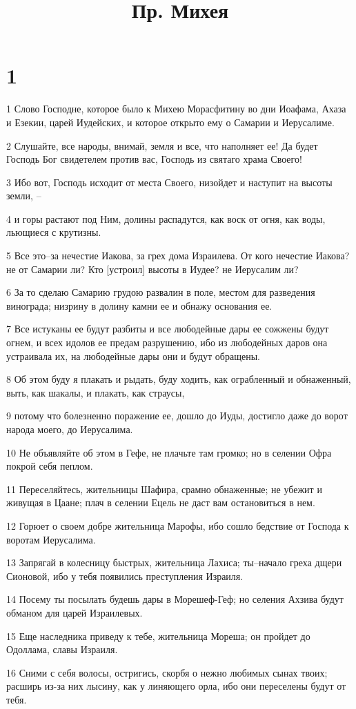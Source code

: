 

\title{Пр. Михея}


\chapter{1}

\par 1 Слово Господне, которое было к Михею Морасфитину во дни Иоафама, Ахаза и Езекии, царей Иудейских, и которое открыто ему о Самарии и Иерусалиме.
\par 2 Слушайте, все народы, внимай, земля и все, что наполняет ее! Да будет Господь Бог свидетелем против вас, Господь из святаго храма Своего!
\par 3 Ибо вот, Господь исходит от места Своего, низойдет и наступит на высоты земли, --
\par 4 и горы растают под Ним, долины распадутся, как воск от огня, как воды, льющиеся с крутизны.
\par 5 Все это--за нечестие Иакова, за грех дома Израилева. От кого нечестие Иакова? не от Самарии ли? Кто [устроил] высоты в Иудее? не Иерусалим ли?
\par 6 За то сделаю Самарию грудою развалин в поле, местом для разведения винограда; низрину в долину камни ее и обнажу основания ее.
\par 7 Все истуканы ее будут разбиты и все любодейные дары ее сожжены будут огнем, и всех идолов ее предам разрушению, ибо из любодейных даров она устраивала их, на любодейные дары они и будут обращены.
\par 8 Об этом буду я плакать и рыдать, буду ходить, как ограбленный и обнаженный, выть, как шакалы, и плакать, как страусы,
\par 9 потому что болезненно поражение ее, дошло до Иуды, достигло даже до ворот народа моего, до Иерусалима.
\par 10 Не объявляйте об этом в Гефе, не плачьте там громко; но в селении Офра покрой себя пеплом.
\par 11 Переселяйтесь, жительницы Шафира, срамно обнаженные; не убежит и живущая в Цаане; плач в селении Ецель не даст вам остановиться в нем.
\par 12 Горюет о своем добре жительница Марофы, ибо сошло бедствие от Господа к воротам Иерусалима.
\par 13 Запрягай в колесницу быстрых, жительница Лахиса; ты--начало греха дщери Сионовой, ибо у тебя появились преступления Израиля.
\par 14 Посему ты посылать будешь дары в Морешеф-Геф; но селения Ахзива будут обманом для царей Израилевых.
\par 15 Еще наследника приведу к тебе, жительница Мореша; он пройдет до Одоллама, славы Израиля.
\par 16 Сними с себя волосы, остригись, скорбя о нежно любимых сынах твоих; расширь из-за них лысину, как у линяющего орла, ибо они переселены будут от тебя.

